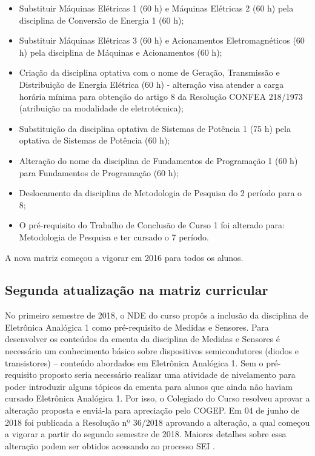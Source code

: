 \begin{itemize}
	\item Substituir Máquinas Elétricas 1 (60 h) e Máquinas Elétricas 2 (60 h) pela disciplina de Conversão de Energia 1 (60 h);
	
	\item Substituir Máquinas Elétricas 3 (60 h) e Acionamentos Eletromagnéticos (60 h) pela disciplina de Máquinas e Acionamentos (60 h);
	
	\item Criação da disciplina optativa com o nome de Geração, Transmissão e Distribuição de Energia Elétrica (60 h) - alteração visa atender a carga horária mínima para obtenção do artigo 8\textordmasculine{} da Resolução CONFEA 218/1973 (atribuição na modalidade de eletrotécnica);
	
	\item Substituição da disciplina optativa de Sistemas de Potência 1 (75 h) pela optativa de Sistemas de Potência (60 h);
	
	\item Alteração do nome da disciplina de Fundamentos de Programação 1 (60 h) para Fundamentos de Programação (60 h);
	
	\item Deslocamento da disciplina de Metodologia de Pesquisa do 2\textordmasculine{} período para o 8\textordmasculine{};
	
	\item O pré-requisito do Trabalho de Conclusão de Curso 1 foi alterado para: Metodologia de Pesquisa e ter cursado o 7\textordmasculine{} período.
	
	
\end{itemize}

A nova matriz começou a vigorar em 2016 para todos os alunos.

\subsection{Segunda atualização na matriz curricular}

No primeiro semestre de 2018, o NDE do curso propôs a inclusão da disciplina de Eletrônica Analógica 1 como pré-requisito de Medidas e Sensores. Para desenvolver os conteúdos da ementa da disciplina de Medidas e Sensores é necessário um conhecimento básico sobre dispositivos semicondutores (diodos e transistores) – conteúdo abordados em Eletrônica Analógica 1. Sem o pré-requisito proposto seria necessário realizar uma atividade de nivelamento para poder introduzir alguns tópicos da ementa para alunos que ainda não haviam cursado Eletrônica Analógica 1. Por isso, o Colegiado do Curso resolveu aprovar a alteração proposta e enviá-la para apreciação pelo COGEP. Em 04 de junho de 2018 foi publicada a Resolução nº 36/2018 aprovando a alteração, a qual começou a vigorar a partir do segundo semestre de 2018. Maiores detalhes sobre essa alteração podem ser obtidos acessando ao processo SEI .

